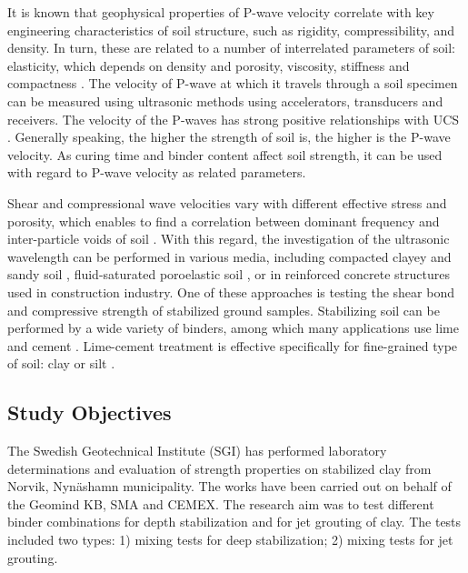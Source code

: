 \documentclass[USenglish,twocolumn]{article}
\begin{document}
It is known that geophysical properties of P-wave velocity correlate with key engineering characteristics of soil structure, such as rigidity, compressibility, and density. In turn, these are related to a number of interrelated parameters of soil: elasticity, which depends on density and porosity, viscosity, stiffness and compactness \cite{askeland2008essentials,askeland2005science}. The velocity of P-wave at which it travels through a soil specimen can be measured using ultrasonic methods using accelerators, transducers and receivers. The velocity of the P-waves has strong positive relationships with UCS \cite{Sarno,Pellet}. Generally speaking, the higher the strength of soil is, the higher is the P-wave velocity. As curing time and binder content affect soil strength, it can be used with regard to P-wave velocity as related parameters. 

Shear and compressional wave velocities vary with different effective stress and porosity, which enables to find a correlation between dominant frequency and inter-particle voids of soil \cite{Gheibi}. With this regard, the investigation of the ultrasonic wavelength can be performed in various media, including compacted clayey and sandy soil \cite{Sarroetal2021}, fluid-saturated poroelastic soil \cite{Shietal2017}, or in reinforced concrete structures \cite{Carpinteri,Aggelis} used in construction industry. One of these approaches is testing the shear bond and compressive strength of stabilized ground samples. Stabilizing soil can be performed by a wide variety of binders, among which many applications use lime \cite{DiSanteetal2020,LindhLemenkova2022CEE} and cement \cite{Lemenkova202222}. Lime-cement treatment is effective specifically for fine-grained type of soil: clay or silt \cite{Brice,Heath,Addison,Rogers,Solanki}.  

\subsection{Study Objectives}

The Swedish Geotechnical Institute (SGI) has performed laboratory determinations and evaluation of strength properties on stabilized clay from Norvik, Nynäshamn municipality. The works have been carried out on behalf of the Geomind KB, SMA and CEMEX. The research aim was to test different binder combinations for depth stabilization and for jet grouting of clay. The tests included two types: 1) mixing tests for deep stabilization; 2) mixing tests for jet grouting. 
\end{document}
